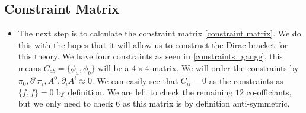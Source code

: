 \documentclass[11pt]{article}
\numberwithin{equation}{section}
\begin{document}
\subsection{Constraint Matrix} %
\label{sub:constraint_matrix}
\begin{itemize}
  \item The next step is to calculate the constraint matrix \ref{constraint matrix}. We do this with the hopes that it will allow us to construct the Dirac bracket for this theory. We have four constraints as seen in \ref{constraints_gauge}, this means $C_{ab} = \{\phi_a,\phi_b\}$ will be a $4 \times 4$ matrix. We will order the constraints by $\pi_0,\partial^i\pi_i,A^0, \partial_iA^i \approx 0$. We can easily see that $C_{ii}=0$ as the constraints as $\{f,f\} =0$ by definition. We are left to check the remaining $12$ co-officiants, but we only need to check $6$ as this matrix is by definition anti-symmetric. 


\end{itemize}
\end{document}
